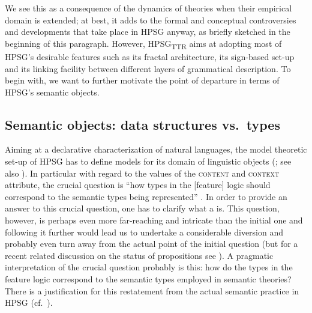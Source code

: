 \documentclass[output=paper,biblatex,babelshorthands,newtxmath,draftmode,colorlinks,citecolor=brown]{langscibook}
\begin{document}
%
We see this as a consequence of the dynamics of theories when their empirical domain is extended; at best, it adds to the formal and conceptual controversies and developments that take place in HPSG anyway, as briefly sketched in the beginning of this paragraph. 
%
However, HPSG\textsubscript{TTR} aims at adopting most of HPSG's desirable features such as its fractal architecture, its sign-based set-up and its linking facility between different layers of grammatical description. 
%
To begin with, we want to further motivate the point of departure in terms of HPSG's semantic objects.


\subsection{Semantic objects: data structures vs.\ types}
\label{sec:semantic-objects}

\largerpage
Aiming at a declarative characterization of natural languages, the model theoretic set-up of HPSG has to define models for its domain of linguistic objects  (\citealt[Section~3]{Levine:Meurers:2006}; see also ).
%
In particular with regard to the values of the \textsc{content} and \textsc{context} attribute, the crucial question is \enquote{how types in the [feature] logic should correspond to the semantic types being represented}  \citep[]{Penn:2000}.
%
In order to provide an answer to this crucial question, one has to clarify what a  is. 
%
This question, however, is perhaps even more far-reaching and intricate than the initial one and following it further would lead us to undertake a considerable diversion and probably even turn away from the actual point of the initial question (but for a recent related discussion on the status of propositions see \citealt{King:Soames:Speaks:2014}).
%
A pragmatic interpretation of the crucial question probably is this: how do the types in the feature logic correspond to the semantic types employed in semantic theories?
%
There is a justification for this restatement from the actual semantic practice in HPSG (cf.\ ).
\end{document}
